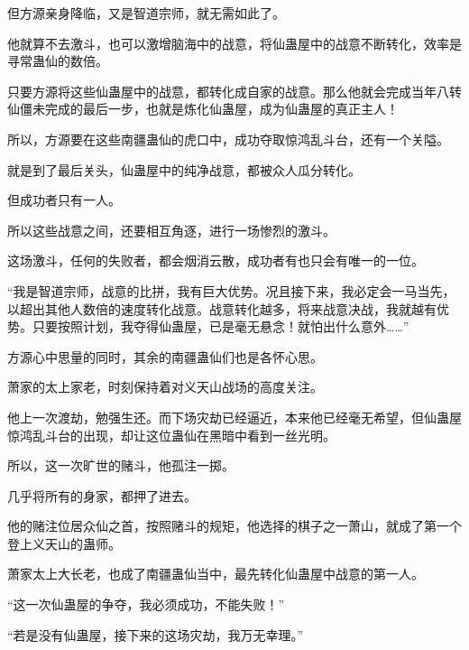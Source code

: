 \begin{this_body}
但方源亲身降临，又是智道宗师，就无需如此了。

他就算不去激斗，也可以激增脑海中的战意，将仙蛊屋中的战意不断转化，效率是寻常蛊仙的数倍。

只要方源将这些仙蛊屋中的战意，都转化成自家的战意。那么他就会完成当年八转仙僵未完成的最后一步，也就是炼化仙蛊屋，成为仙蛊屋的真正主人！

所以，方源要在这些南疆蛊仙的虎口中，成功夺取惊鸿乱斗台，还有一个关隘。

就是到了最后关头，仙蛊屋中的纯净战意，都被众人瓜分转化。

但成功者只有一人。

所以这些战意之间，还要相互角逐，进行一场惨烈的激斗。

这场激斗，任何的失败者，都会烟消云散，成功者有也只会有唯一的一位。

“我是智道宗师，战意的比拼，我有巨大优势。况且接下来，我必定会一马当先，以超出其他人数倍的速度转化战意。战意转化越多，将来战意决战，我就越有优势。只要按照计划，我夺得仙蛊屋，已是毫无悬念！就怕出什么意外……”

方源心中思量的同时，其余的南疆蛊仙们也是各怀心思。

萧家的太上家老，时刻保持着对义天山战场的高度关注。

他上一次渡劫，勉强生还。而下场灾劫已经逼近，本来他已经毫无希望，但仙蛊屋惊鸿乱斗台的出现，却让这位蛊仙在黑暗中看到一丝光明。

所以，这一次旷世的赌斗，他孤注一掷。

几乎将所有的身家，都押了进去。

他的赌注位居众仙之首，按照赌斗的规矩，他选择的棋子之一萧山，就成了第一个登上义天山的蛊师。

萧家太上大长老，也成了南疆蛊仙当中，最先转化仙蛊屋中战意的第一人。

“这一次仙蛊屋的争夺，我必须成功，不能失败！”

“若是没有仙蛊屋，接下来的这场灾劫，我万无幸理。”

\end{this_body}


